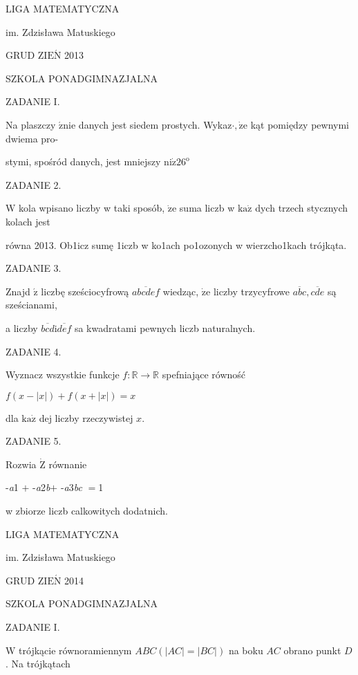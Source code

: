 \documentclass[a4paper,12pt]{article}
\begin{document}
LIGA MATEMATYCZNA

im. Zdzisława Matuskiego

GRUD Z$\mathrm{I}\mathrm{E}\acute{\mathrm{N}}$ 2013

SZKOLA PONADGIMNAZJALNA

ZADANIE I.

Na plaszczy $\acute{\mathrm{z}}\mathrm{n}\mathrm{i}\mathrm{e}$ danych jest siedem prostych. Wykaz$\cdot, \dot{\mathrm{z}}\mathrm{e}$ kąt pomiędzy pewnymi dwiema pro-

stymi, spośród danych, jest mniejszy $\mathrm{n}\mathrm{i}\dot{\mathrm{z}}26^{\mathrm{o}}$

ZADANIE 2.

$\mathrm{W}$ kola wpisano liczby w taki sposób, $\dot{\mathrm{z}}\mathrm{e}$ suma liczb w $\mathrm{k}\mathrm{a}\dot{\mathrm{z}}$ dych trzech stycznych kolach jest

równa 2013. Ob1icz sumę 1iczb w ko1ach po1ozonych w wierzcho1kach trójkąta.

ZADANIE 3.

Znajd $\acute{\mathrm{z}}$ liczbę sześciocyfrową $\overline{abcdef}$ wiedząc, $\dot{\mathrm{z}}\mathrm{e}$ liczby trzycyfrowe $\overline{abc}, \overline{cde}$ są sześcianami,

a liczby $\overline{bcd}\mathrm{i}\overline{def}$ sa kwadratami pewnych liczb naturalnych.

ZADANIE 4.

Wyznacz wszystkie funkcje $f:\mathbb{R}\rightarrow \mathbb{R}$ spefniające równość

$f(x-|x|)+f(x+|x|)=x$

dla $\mathrm{k}\mathrm{a}\dot{\mathrm{z}}$ dej liczby rzeczywistej $x.$

ZADANIE 5.

Rozwia $\dot{\mathrm{Z}}$ równanie

-{\it a}1 $+$ -{\it a}2{\it b}$+$ -{\it a}3{\it bc} $=$1

w zbiorze liczb calkowitych dodatnich.






LIGA MATEMATYCZNA

im. Zdzisława Matuskiego

GRUD Z$\mathrm{I}\mathrm{E}\acute{\mathrm{N}}$ 2014

SZKOLA PONADGIMNAZJALNA

ZADANIE I.

$\mathrm{W}$ trójkącie równoramiennym $ABC(|AC|=|BC|)$ na boku $AC$ obrano punkt $D$. Na trójkątach
\end{document}
